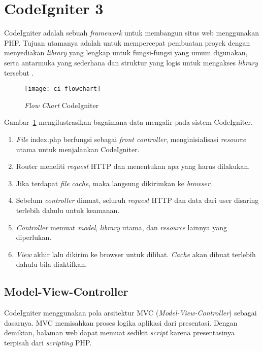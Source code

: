 \section{CodeIgniter 3}
\label{sec:2:codeigniter} 

CodeIgniter adalah sebuah \textit{framework} untuk membangun situs web menggunakan PHP. Tujuan utamanya adalah untuk mempercepat pembuatan proyek dengan menyediakan \textit{library} yang lengkap untuk fungsi-fungsi yang umum digunakan, serta antarmuka yang sederhana dan struktur yang logis untuk mengakses \textit{library} tersebut \cite{codeigniter}.

\begin{figure}[H]
	\centering  
	\texttt{[image: ci-flowchart]}  
	\caption{\textit{Flow Chart} CodeIgniter}
	\label{fig:2:ciflowchart} 
\end{figure} 

Gambar~\ref{fig:2:ciflowchart} mengilustrasikan bagaimana data mengalir pada sistem CodeIgniter.

\begin{enumerate}
	\item \textit{File} index.php berfungsi sebagai \textit{front controller}, menginisialisasi \textit{resource} utama untuk menjalankan CodeIgniter.
	\item Router meneliti \textit{request} HTTP dan menentukan apa yang harus dilakukan.
	\item Jika terdapat \textit{file} \textit{cache}, maka langsung dikirimkan ke \textit{browser}.
	\item Sebelum \textit{controller} dimuat, seluruh \textit{request} HTTP dan data dari user disaring terlebih dahulu untuk keamanan.
	\item \textit{Controller} memuat \textit{model}, \textit{library} utama, dan  \textit{resource} lainnya yang diperlukan.
	\item \textit{View} akhir lalu dikirim ke browser untuk dilihat. \textit{Cache} akan dibuat terlebih dahulu bila diaktifkan. 
\end{enumerate}

\subsection{Model-View-Controller}
\label{subs:2:cimvc} 
CodeIgniter menggunakan pola arsitektur MVC (\textit{Model-View-Controller}) sebagai dasarnya. MVC memisahkan proses logika aplikasi dari presentasi. Dengan demikian, halaman web dapat memuat sedikit \textit{script} karena presentasinya terpisah dari \textit{scripting} PHP.

